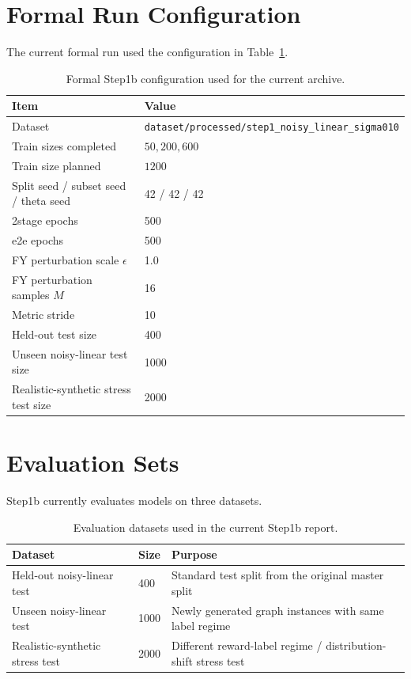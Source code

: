 \documentclass[11pt]{article}
\begin{document}
\section{Formal Run Configuration}

The current formal run used the configuration in Table~\ref{tab:step1b-config}.

\begin{table}[h]
\centering
\caption{Formal Step1b configuration used for the current archive.}
\label{tab:step1b-config}
\begin{tabular}{ll}
\toprule
Item & Value \\
\midrule
Dataset & \texttt{dataset/processed/step1\_noisy\_linear\_sigma010} \\
Train sizes completed & \(50, 200, 600\) \\
Train size planned & \(1200\) \\
Split seed / subset seed / theta seed & 42 / 42 / 42 \\
2stage epochs & 500 \\
e2e epochs & 500 \\
FY perturbation scale \(\epsilon\) & 1.0 \\
FY perturbation samples \(M\) & 16 \\
Metric stride & 10 \\
Held-out test size & 400 \\
Unseen noisy-linear test size & 1000 \\
Realistic-synthetic stress test size & 2000 \\
\bottomrule
\end{tabular}
\end{table}

\section{Evaluation Sets}

Step1b currently evaluates models on three datasets.

\begin{table}[h]
\centering
\caption{Evaluation datasets used in the current Step1b report.}
\label{tab:evaluation-datasets}
\begin{tabular}{lll}
\toprule
Dataset & Size & Purpose \\
\midrule
Held-out noisy-linear test & 400 & Standard test split from the original master split \\
Unseen noisy-linear test & 1000 & Newly generated graph instances with same label regime \\
Realistic-synthetic stress test & 2000 & Different reward-label regime / distribution-shift stress test \\
\bottomrule
\end{tabular}
\end{table}
\end{document}

